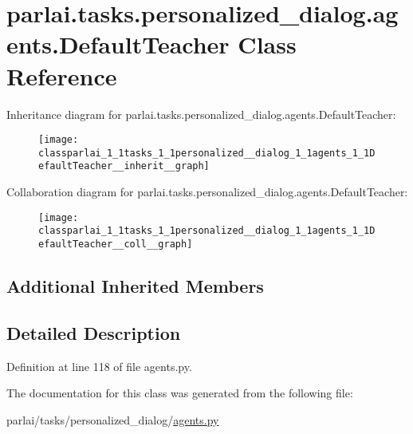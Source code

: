 \hypertarget{classparlai_1_1tasks_1_1personalized__dialog_1_1agents_1_1DefaultTeacher}{}\section{parlai.\+tasks.\+personalized\+\_\+dialog.\+agents.\+Default\+Teacher Class Reference}
\label{classparlai_1_1tasks_1_1personalized__dialog_1_1agents_1_1DefaultTeacher}


Inheritance diagram for parlai.\+tasks.\+personalized\+\_\+dialog.\+agents.\+Default\+Teacher\+:
\nopagebreak
\begin{figure}[H]
\begin{center}
\leavevmode
\texttt{[image: classparlai\_1\_1tasks\_1\_1personalized\_\_dialog\_1\_1agents\_1\_1DefaultTeacher\_\_inherit\_\_graph]}
\end{center}
\end{figure}


Collaboration diagram for parlai.\+tasks.\+personalized\+\_\+dialog.\+agents.\+Default\+Teacher\+:
\nopagebreak
\begin{figure}[H]
\begin{center}
\leavevmode
\texttt{[image: classparlai\_1\_1tasks\_1\_1personalized\_\_dialog\_1\_1agents\_1\_1DefaultTeacher\_\_coll\_\_graph]}
\end{center}
\end{figure}
\subsection*{Additional Inherited Members}


\subsection{Detailed Description}


Definition at line 118 of file agents.\+py.



The documentation for this class was generated from the following file\+:\begin{DoxyCompactItemize}
\item 
parlai/tasks/personalized\+\_\+dialog/\hyperlink{parlai_2tasks_2personalized__dialog_2agents_8py}{agents.\+py}\end{DoxyCompactItemize}
